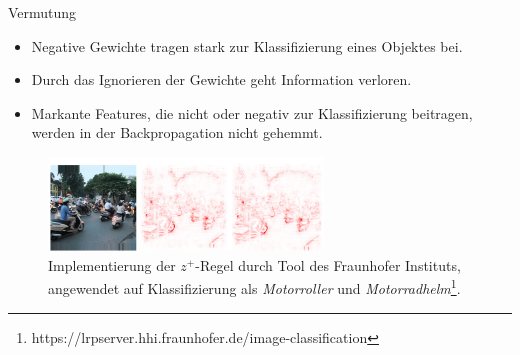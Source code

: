 \begin{frame}{Vermutung}
\begin{itemize}
\item Negative Gewichte tragen stark zur Klassifizierung eines Objektes bei.
\item Durch das Ignorieren der Gewichte geht Information verloren.
\item Markante Features, die nicht oder negativ zur Klassifizierung beitragen, werden in der Backpropagation nicht gehemmt.
\end{itemize}
\begin{figure}
\includegraphics[width=0.65\textwidth]{grafiken_theo/expl_ai_z+.jpeg}
\caption{Implementierung der $z^+$-Regel durch Tool des Fraunhofer Instituts, angewendet auf Klassifizierung als \textit{Motorroller} und 
\textit{Motorradhelm}\footnote{https://lrpserver.hhi.fraunhofer.de/image-classification}.}
\end{figure}
\end{frame}